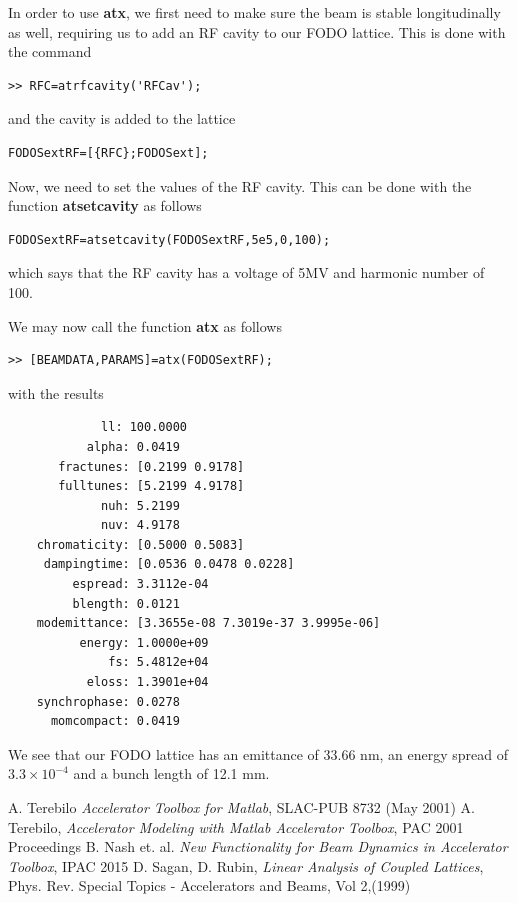 \documentclass[acus]{article}
\newcommand{\mfun}[1]{{\bf{#1}}}
\begin{document}
In order to use \mfun{atx}, we first need to make sure the beam is stable longitudinally as 
well, requiring us to add an RF cavity to our FODO lattice.  This is done with the command
\begin{verbatim}
>> RFC=atrfcavity('RFCav');
\end{verbatim}
and the cavity is added to the lattice
\begin{verbatim}
FODOSextRF=[{RFC};FODOSext];
\end{verbatim}
Now, we need to set the values of the RF cavity.  This can be done with the 
function \mfun{atsetcavity} as follows
\begin{verbatim}
FODOSextRF=atsetcavity(FODOSextRF,5e5,0,100);
\end{verbatim}
which says that the RF cavity has a voltage of 5MV and harmonic number of 100.

We may now call the function \mfun{atx} as follows
\begin{verbatim}
>> [BEAMDATA,PARAMS]=atx(FODOSextRF);
\end{verbatim}
with the results
\begin{verbatim}
             ll: 100.0000
           alpha: 0.0419
       fractunes: [0.2199 0.9178]
       fulltunes: [5.2199 4.9178]
             nuh: 5.2199
             nuv: 4.9178
    chromaticity: [0.5000 0.5083]
     dampingtime: [0.0536 0.0478 0.0228]
         espread: 3.3112e-04
         blength: 0.0121
    modemittance: [3.3655e-08 7.3019e-37 3.9995e-06]
          energy: 1.0000e+09
              fs: 5.4812e+04
           eloss: 1.3901e+04
    synchrophase: 0.0278
      momcompact: 0.0419
\end{verbatim}
We see that our FODO lattice has an emittance of 33.66 nm, an energy spread of $3.3\times 10^{-4}$
and a bunch length of 12.1 mm.


\begin{thebibliography}{4}

A. Terebilo \emph{Accelerator Toolbox for Matlab}, SLAC-PUB 8732 (May 2001)
A. Terebilo, \emph{Accelerator Modeling with Matlab Accelerator Toolbox}, PAC 2001 Proceedings
B. Nash et. al. \emph{New Functionality for Beam Dynamics in Accelerator Toolbox}, IPAC 2015
D. Sagan, D. Rubin, \emph{Linear Analysis of Coupled Lattices}, Phys. Rev. Special Topics - Accelerators and Beams, Vol 2,(1999)

\end{thebibliography}
\end{document}
